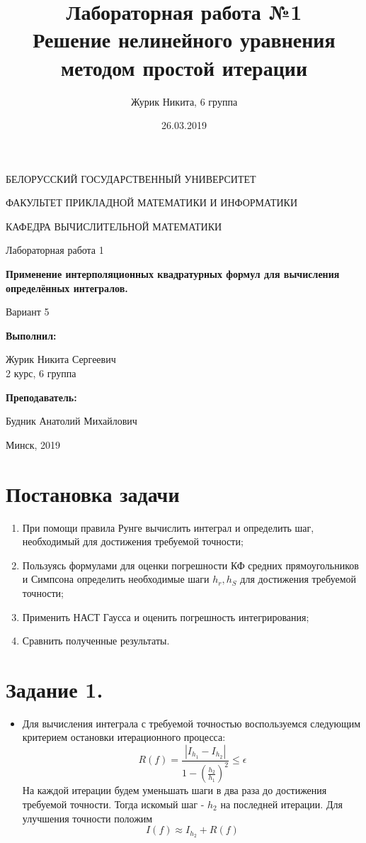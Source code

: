 \documentclass[14pt, a4paper]{article}
\title {Лабораторная работа №1 \\ Решение нелинейного уравнения методом простой итерации}
\author {Журик Никита, 6 группа}
\date {26.03.2019}
\begin{document}
\begin{titlepage}
\begin{center}
\large{БЕЛОРУССКИЙ ГОСУДАРСТВЕННЫЙ УНИВЕРСИТЕТ 

ФАКУЛЬТЕТ ПРИКЛАДНОЙ МАТЕМАТИКИ И ИНФОРМАТИКИ

КАФЕДРА ВЫЧИСЛИТЕЛЬНОЙ МАТЕМАТИКИ}
\end{center}
\vspace*{\fill}
\begin{center}
Лабораторная работа 1

\large{\textbf{Применение интерполяционных квадратурных формул для вычисления определённых интегралов.}}

Вариант 5
\end{center}
\begin{flushright}
\textbf{Выполнил:}

Журик Никита Сергеевич \\ 2 курс, 6 группа

\textbf{Преподаватель:}

Будник Анатолий Михайлович
\end{flushright}
\vspace*{\fill}
\begin{center}
Минск, 2019
\end{center}
\end{titlepage}

\tableofcontents
\newpage

\newpage
{}

  \section{Постановка задачи}
    \begin{enumerate}
      \item
	При помощи правила Рунге вычислить интеграл и определить шаг, необходимый для достижения требуемой точности;
	\item
	Пользуясь формулами для оценки погрешности КФ средних прямоугольников и Симпсона определить необходимые шаги $h_r, h_S$ для достижения требуемой точности;
	\item
	Применить НАСТ Гаусса и оценить погрешность интегрирования;
	\item
	Сравнить полученные результаты.
    \end{enumerate}
  \section{Задание 1.}
  \begin{itemize}
	\item
	Для вычисления интеграла с требуемой точностью воспользуемся следующим критерием остановки итерационного процесса: $$R(f) = \frac{|I_{h_1}-I_{h_2}|}{1-\left(\frac{h_2}{h_1}\right)^2} \leq \epsilon$$
	На каждой итерации будем уменьшать шаги в два раза до достижения требуемой точности. Тогда искомый шаг - $h_2$ на последней итерации.
	Для улучшения точности положим $$I(f) \approx I_{h_2} + R(f)$$
  \end{itemize}
\end{document}
